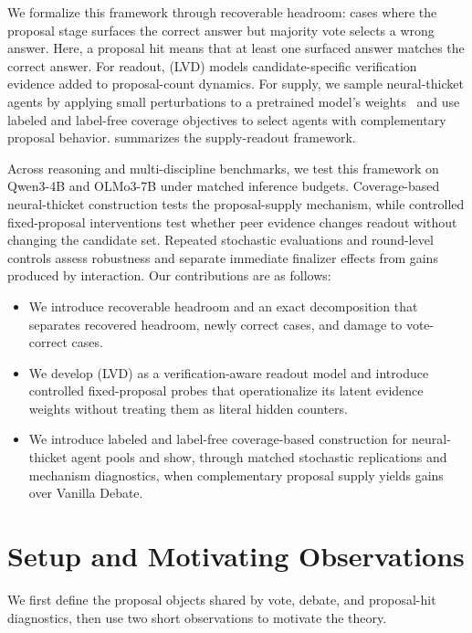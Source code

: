 We formalize this framework through recoverable headroom: cases where the
proposal stage surfaces the correct answer but majority vote selects a wrong
answer. Here, a proposal hit means that at least one surfaced answer matches the
correct answer. For readout, \readout{} (LVD) models candidate-specific
verification evidence added to proposal-count dynamics. For supply, we sample
neural-thicket agents by applying small perturbations to a pretrained model's
weights~\citep{gan2026neuralthicketsdiversetask, zhang2026tokur,
shi2025trainingfree} and use labeled and label-free coverage objectives to
select agents with complementary proposal behavior. 
summarizes the supply-readout framework.

Across reasoning and multi-discipline benchmarks, we test this framework on
Qwen3-4B and OLMo3-7B under matched inference budgets. Coverage-based
neural-thicket construction tests the proposal-supply mechanism, while
controlled fixed-proposal interventions test whether peer evidence changes
readout without changing the candidate set. Repeated stochastic evaluations
and round-level controls assess robustness and separate immediate finalizer
effects from gains produced by interaction.
Our contributions are as follows:
\begin{itemize}[nosep]
\item We introduce recoverable headroom and an exact decomposition that
separates recovered headroom, newly correct cases, and damage to vote-correct
cases.
\item We develop \readout{} (LVD) as a verification-aware readout model and
introduce controlled fixed-proposal probes that operationalize its latent
evidence weights without treating them as literal hidden counters.
\item We introduce labeled and label-free coverage-based construction for
neural-thicket agent pools and show, through matched stochastic replications
and mechanism diagnostics, when complementary proposal supply yields gains over
Vanilla Debate.
\end{itemize}

\section{Setup and Motivating Observations}
\label{sec:setup_motivation}
\label{sec:setup}

We first define the proposal objects shared by vote, debate, and proposal-hit
diagnostics, then use two short observations to motivate the theory.

